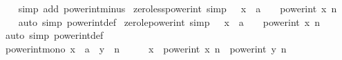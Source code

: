 \begin{isabellebody}
%
\isadelimproof
\ \ %
\endisadelimproof
%
\isatagproof
{}\isamarkupfalse%
\ {\isacharparenleft}{\kern0pt}simp\ add{\isacharcolon}{\kern0pt}\ power{\isacharunderscore}{\kern0pt}int{\isacharunderscore}{\kern0pt}minus{\isacharparenright}{\kern0pt}%
\endisatagproof
{\isafoldproof}%
%
\isadelimproof
\isanewline
%
\endisadelimproof
\isanewline
{}\isamarkupfalse%
\ zero{\isacharunderscore}{\kern0pt}less{\isacharunderscore}{\kern0pt}power{\isacharunderscore}{\kern0pt}int\ {\isacharbrackleft}{\kern0pt}simp{\isacharbrackright}{\kern0pt}{\isacharcolon}{\kern0pt}\ {\isachardoublequoteopen}{}\ {\isacharless}{\kern0pt}\ {\isacharparenleft}{\kern0pt}x\ {\isacharcolon}{\kern0pt}{\isacharcolon}{\kern0pt}\ {\isacharprime}{\kern0pt}a{\isacharparenright}{\kern0pt}\ {\isasymLongrightarrow}\ {}\ {\isacharless}{\kern0pt}\ power{\isacharunderscore}{\kern0pt}int\ x\ n{\isachardoublequoteclose}\isanewline
%
\isadelimproof
\ \ %
\endisadelimproof
%
\isatagproof
{}\isamarkupfalse%
\ {\isacharparenleft}{\kern0pt}auto\ simp{\isacharcolon}{\kern0pt}\ power{\isacharunderscore}{\kern0pt}int{\isacharunderscore}{\kern0pt}def{\isacharparenright}{\kern0pt}%
\endisatagproof
{\isafoldproof}%
%
\isadelimproof
\isanewline
%
\endisadelimproof
\isanewline
{}\isamarkupfalse%
\ zero{\isacharunderscore}{\kern0pt}le{\isacharunderscore}{\kern0pt}power{\isacharunderscore}{\kern0pt}int\ {\isacharbrackleft}{\kern0pt}simp{\isacharbrackright}{\kern0pt}{\isacharcolon}{\kern0pt}\ {\isachardoublequoteopen}{}\ {\isasymle}\ {\isacharparenleft}{\kern0pt}x\ {\isacharcolon}{\kern0pt}{\isacharcolon}{\kern0pt}\ {\isacharprime}{\kern0pt}a{\isacharparenright}{\kern0pt}\ {\isasymLongrightarrow}\ {}\ {\isasymle}\ power{\isacharunderscore}{\kern0pt}int\ x\ n{\isachardoublequoteclose}\isanewline
%
\isadelimproof
\ \ %
\endisadelimproof
%
\isatagproof
{}\isamarkupfalse%
\ {\isacharparenleft}{\kern0pt}auto\ simp{\isacharcolon}{\kern0pt}\ power{\isacharunderscore}{\kern0pt}int{\isacharunderscore}{\kern0pt}def{\isacharparenright}{\kern0pt}%
\endisatagproof
{\isafoldproof}%
%
\isadelimproof
\isanewline
%
\endisadelimproof
\isanewline
{}\isamarkupfalse%
\ power{\isacharunderscore}{\kern0pt}int{\isacharunderscore}{\kern0pt}mono{\isacharcolon}{\kern0pt}\ {\isachardoublequoteopen}{\isacharparenleft}{\kern0pt}x\ {\isacharcolon}{\kern0pt}{\isacharcolon}{\kern0pt}\ {\isacharprime}{\kern0pt}a{\isacharparenright}{\kern0pt}\ {\isasymle}\ y\ {\isasymLongrightarrow}\ n\ {\isasymge}\ {}\ {\isasymLongrightarrow}\ {}\ {\isasymle}\ x\ {\isasymLongrightarrow}\ power{\isacharunderscore}{\kern0pt}int\ x\ n\ {\isasymle}\ power{\isacharunderscore}{\kern0pt}int\ y\ n{\isachardoublequoteclose}\isanewline

\end{isabellebody}
